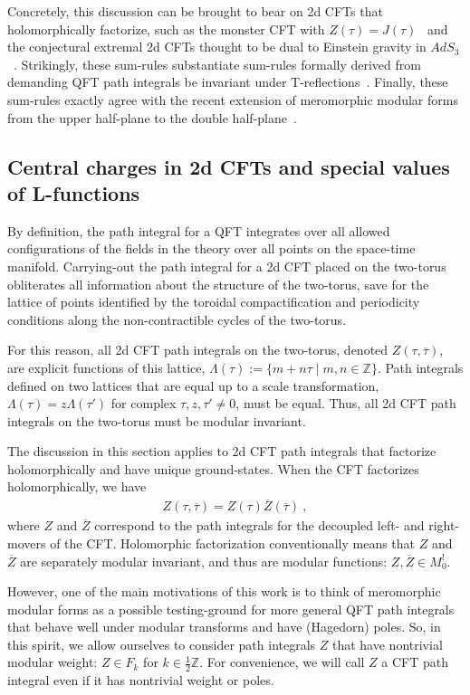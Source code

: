 \documentclass[11pt,a4paper]{article}
\def\Z{\mathbb{Z}}
\begin{document}
Concretely, this discussion can be brought to bear on 2d CFTs that holomorphically factorize, such as the monster CFT with $Z(\tau) = J(\tau)$~\cite{28-FLM1984} and the conjectural extremal 2d CFTs thought to be dual to Einstein gravity in $AdS_3$~\cite{29-W2007}. Strikingly, these sum-rules substantiate sum-rules formally derived from demanding QFT path integrals be invariant under T-reflections~\cite{06T-rex1, 07T-rex2}. Finally, these sum-rules exactly agree with the recent extension of meromorphic modular forms from the upper half-plane to the double half-plane~\cite{30T-rex2-GL2}.

\subsection{Central charges in 2d CFTs and special values of L-functions}\label{secBasics}

By definition, the path integral for a QFT integrates over all allowed configurations of the fields in the theory over all points on the space-time manifold. Carrying-out the path integral for a 2d CFT placed on the two-torus obliterates all information about the structure of the two-torus, save for the lattice of points identified by the toroidal compactification and periodicity conditions along the non-contractible cycles of the two-torus. 

For this reason, all 2d CFT path integrals on the two-torus, denoted $Z(\tau,\overline{\tau})$, are explicit functions of this lattice, $\Lambda(\tau):=\{ m + n \tau \mid m,n \in \Z\}$. Path integrals defined on two lattices that are equal up to a scale transformation, $\Lambda(\tau) = z \Lambda(\tau')$ for complex $\tau,z,\tau'\neq 0$, must be equal. Thus, all 2d CFT path integrals on the two-torus must be modular invariant. 

The discussion in this section applies to 2d CFT path integrals that factorize holomorphically and have unique ground-states. When the CFT factorizes holomorphically, we have
\begin{align}
Z(\tau, \overline{\tau}) = Z(\tau) \overline{Z}(\overline{\tau})~,
\end{align}
where $Z$ and $\overline{Z}$ correspond to the path integrals for the decoupled left- and right-movers of the CFT. Holomorphic factorization conventionally means that $Z$ and $\overline{Z}$ are separately modular invariant, and thus are modular functions: $Z, \overline{Z} \in M_0^!$. 

However, one of the main motivations of this work is to think of meromorphic modular forms as a possible testing-ground for more general QFT path integrals that behave well under modular transforms and have (Hagedorn) poles. So, in this spirit, we allow ourselves to consider path integrals $Z$ that have nontrivial modular weight: $Z \in F_k$ for $k\in \tfrac12 \Z$. For convenience, we will call $Z$ a CFT path integral even if it has nontrivial weight or poles.
\end{document}
